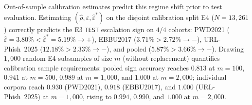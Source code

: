 \documentclass[conference,a4paper]{IEEEtran}
\newcommand{\eps}{\varepsilon}
\newcommand{\rrescue}{\rho}
\begin{document}
Out-of-sample calibration estimates predict this regime shift prior to test
evaluation. Estimating $(\hat{\rrescue},\hat{\eps},\hat{\eps}^{\ast})$ on the
disjoint calibration split E4 ($N=13{,}261$) correctly predicts the E3 \texttt{TEST}
escalation sign on $4/4$ cohorts: PWD2021
($\hat{\eps}=3.80\%<\hat{\eps}^{\ast}=5.19\%\to+$), EBBU2017
($3.71\%>2.72\%\to-$), URL-Phish~2025 ($12.18\%>2.33\%\to-$), and pooled
($5.87\%>3.66\%\to-$). Drawing $1{,}000$ random E4 subsamples of size $m$ (without
replacement) quantifies calibration sample requirements: pooled sign accuracy reaches
$0.813$ at $m=100$, $0.941$ at $m=500$, $0.989$ at $m=1{,}000$, and $1.000$ at
$m=2{,}000$; individual corpora reach $0.930$ (PWD2021), $0.918$ (EBBU2017), and
$1.000$ (URL-Phish~2025) at $m=1{,}000$, rising to $0.994$, $0.990$, and $1.000$ at
$m=2{,}000$.
\end{document}
